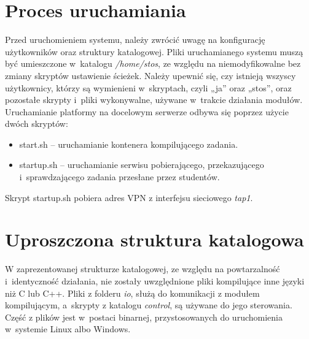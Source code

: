 \section{Proces uruchamiania}
Przed uruchomieniem systemu, należy zwrócić uwagę na konfigurację użytkowników oraz struktury katalogowej. Pliki uruchamianego systemu muszą być umieszczone w~katalogu \textit{/home/stos}, ze względu na niemodyfikowalne bez zmiany skryptów ustawienie ścieżek. Należy upewnić się, czy istnieją wszyscy użytkownicy, którzy są wymienieni w~skryptach, czyli „ja” oraz „stos”, oraz pozostałe skrypty i~pliki wykonywalne, używane w~trakcie działania modułów.
\newline \indent Uruchamianie platformy na docelowym serwerze odbywa się poprzez użycie dwóch skryptów:
\begin{itemize}
    \item start.sh -- uruchamianie kontenera kompilującego zadania.
    \item startup.sh -- uruchamianie serwisu pobierającego, przekazującego i~sprawdzającego zadania przesłane przez studentów.
\end{itemize}
Skrypt startup.sh pobiera adres VPN z interfejsu sieciowego \textit{tap1}. 

\section{Uproszczona struktura katalogowa}
W zaprezentowanej strukturze katalogowej, ze względu na powtarzalność i~identyczność działania, nie zostały uwzględnione pliki kompilujące inne języki niż C lub C++. Pliki z folderu \textit{io}, służą do komunikacji z modułem kompilującym, a~skrypty z katalogu \textit{control}, są używane do jego sterowania. Część z plików jest w~postaci binarnej, przystosowanych do uruchomienia w~systemie Linux albo Windows.
